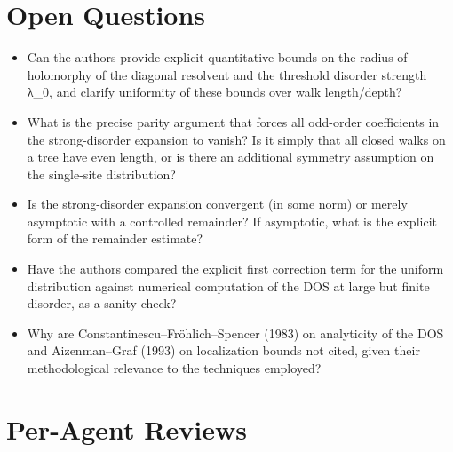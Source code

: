 \documentclass[11pt]{article}
\begin{document}
\section*{Open Questions}
\begin{itemize}[leftmargin=*]
  \item Can the authors provide explicit quantitative bounds on the radius of holomorphy of the diagonal resolvent and the threshold disorder strength λ\_0, and clarify uniformity of these bounds over walk length/depth?
  \item What is the precise parity argument that forces all odd-order coefficients in the strong-disorder expansion to vanish? Is it simply that all closed walks on a tree have even length, or is there an additional symmetry assumption on the single-site distribution?
  \item Is the strong-disorder expansion convergent (in some norm) or merely asymptotic with a controlled remainder? If asymptotic, what is the explicit form of the remainder estimate?
  \item Have the authors compared the explicit first correction term for the uniform distribution against numerical computation of the DOS at large but finite disorder, as a sanity check?
  \item Why are Constantinescu–Fröhlich–Spencer (1983) on analyticity of the DOS and Aizenman–Graf (1993) on localization bounds not cited, given their methodological relevance to the techniques employed?
\end{itemize}

\section*{Per-Agent Reviews}
\end{document}
